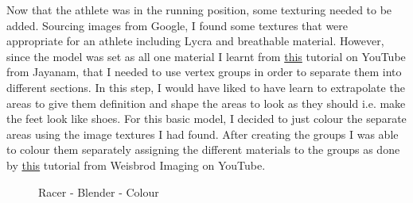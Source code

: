 \documentclass[a4 paper, 12pt]{article}
\begin{document}
Now that the athlete was in the running position, some texturing needed to be added. Sourcing images from Google, I found some textures that were appropriate for an athlete including Lycra and breathable material. However, since the model was set as all one material I learnt from \href{https://www.youtube.com/watch?v=afjGodkdp4U}{this} tutorial on YouTube from Jayanam, that I needed to use vertex groups in order to separate them into different sections. In this step, I would have liked to have learn to extrapolate the areas to give them definition and shape the areas to look as they should i.e. make the feet look like shoes. For this basic model, I decided to just colour the separate areas using the image textures I had found. After creating the groups I was able to colour them separately assigning the different materials to the groups as done by \href{https://www.youtube.com/watch?v=ZWJB7HaKJZY}{this} tutorial from Weisbrod Imaging on YouTube.
    \begin{figure} [H]
        \caption{Racer - Blender - Colour}   
    \end{figure}
\end{document}
